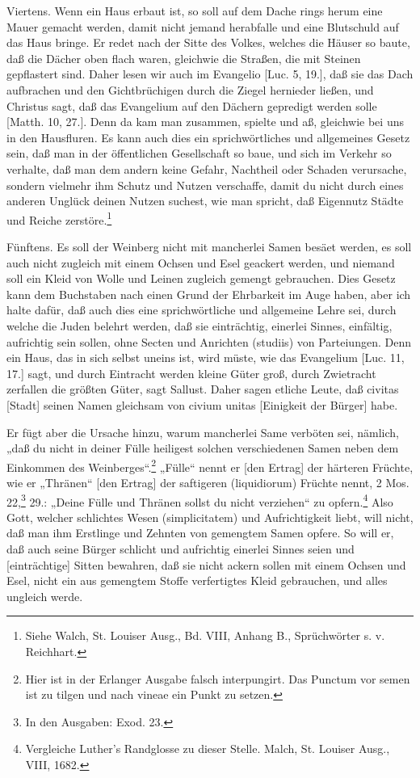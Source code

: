 Viertens. Wenn ein Haus erbaut ist, so soll auf dem Dache rings herum eine Mauer gemacht werden, damit nicht jemand herabfalle und eine Blutschuld auf das Haus bringe. Er redet nach der Sitte des Volkes, welches die Häuser so baute, daß die Dächer oben flach waren, gleichwie die Straßen, die mit Steinen gepflastert sind. Daher lesen wir auch im Evangelio [Luc. 5, 19.], daß sie das Dach aufbrachen und den Gichtbrüchigen durch die Ziegel hernieder ließen, und Christus sagt, daß das Evangelium auf den Dächern gepredigt werden solle [Matth. 10, 27.]. Denn da kam man zusammen, spielte und aß, gleichwie bei uns in den Hausfluren. Es kann auch dies ein sprichwörtliches und allgemeines Gesetz sein, daß man in der öffentlichen Gesellschaft so baue, und sich im Verkehr so verhalte, daß man dem andern keine Gefahr, Nachtheil oder Schaden verursache, sondern vielmehr ihm Schutz und Nutzen verschaffe, damit du nicht durch eines anderen Unglück deinen Nutzen suchest, wie man spricht, daß Eigennutz Städte und Reiche zerstöre.\footnote{Siehe Walch, St. Louiser Ausg., Bd. VIII, Anhang B., Sprüchwörter s. v. Reichhart.}

Fünftens. Es soll der Weinberg nicht mit mancherlei Samen besäet werden, es soll auch nicht zugleich mit einem Ochsen und Esel geackert werden, und niemand soll ein Kleid von Wolle und Leinen zugleich gemengt gebrauchen. Dies Gesetz kann dem Buchstaben nach einen Grund der Ehrbarkeit im Auge haben, aber ich halte dafür, daß auch dies eine sprichwörtliche und allgemeine Lehre sei, durch welche die Juden belehrt werden, daß sie einträchtig, einerlei Sinnes, einfältig, aufrichtig sein sollen, ohne Secten und Anrichten (studiis) von Parteiungen. Denn
ein Haus, das in sich selbst uneins ist, wird müste, wie das Evangelium [Luc. 11, 17.] sagt, und durch Eintracht werden kleine Güter groß, durch Zwietracht zerfallen die größten Güter, sagt Sallust. Daher sagen etliche Leute, daß civitas [Stadt] seinen Namen gleichsam von civium unitas [Einigkeit der Bürger] habe.

Er fügt aber die Ursache hinzu, warum mancherlei Same verböten sei, nämlich, „daß du nicht in deiner Fülle heiligest solchen verschiedenen Samen neben dem Einkommen des Weinberges“.\footnote{Hier ist in der Erlanger Ausgabe falsch interpungirt. Das Punctum vor semen ist zu tilgen und nach vineae ein Punkt zu setzen.} „Fülle“ nennt er [den Ertrag] der härteren Früchte, wie er „Thränen“ [den Ertrag] der saftigeren (liquidiorum) Früchte nennt, 2 Mos. 22,\footnote{In den Ausgaben: Exod. 23.} 29.: „Deine Fülle und Thränen sollst du nicht verziehen“ zu opfern.\footnote{Vergleiche Luther’s Randglosse zu dieser Stelle. Malch, St. Louiser Ausg., VIII, 1682.} Also Gott, welcher schlichtes Wesen (simplicitatem) und Aufrichtigkeit liebt, will nicht, daß man ihm Erstlinge und Zehnten von gemengtem Samen opfere. So will er, daß auch seine Bürger schlicht und aufrichtig einerlei Sinnes seien und [einträchtige] Sitten bewahren, daß sie nicht ackern sollen mit einem Ochsen und Esel, nicht ein aus gemengtem Stoffe verfertigtes Kleid gebrauchen, und alles ungleich werde.

